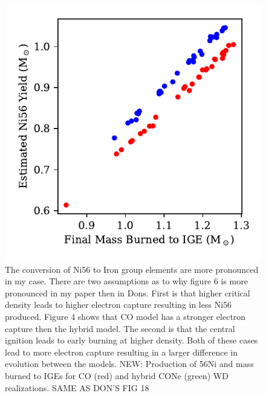 \documentclass[iop,apj]{emulateapj}
\begin{document}
\begin{figure}
\includegraphics[width=\columnwidth]{figures/FMBTI_v_Ni56Yield_plot.pdf}
\caption{\label{fig:compare}
The conversion of Ni56 to Iron group elements are more pronounced in my case. There are two assumptions as to why figure 6 is more pronounced in my paper then in Dons. 
First is that higher critical density leads to higher electron capture resulting in less Ni56 produced. Figure 4 shows that CO model has a stronger electron capture then the hybrid model. The second is that the central ignition leads to early burning at higher density. Both of these cases lead to more electron capture resulting in a larger difference in evolution between the models.
NEW: Production of 56Ni and mass burned to IGEs for CO (red) and
hybrid CONe (green) WD realizations. SAME AS DON'S FIG 18
}
\end{figure}
\end{document}
